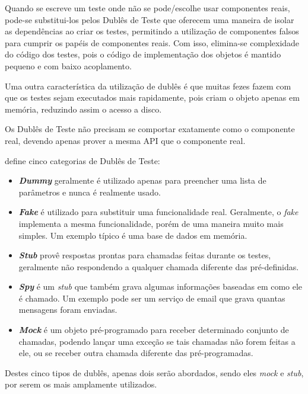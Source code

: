 Quando se escreve um teste onde não se pode/escolhe usar componentes reais, pode-se substitui-los pelos Dublês de Teste que oferecem uma maneira de isolar as dependências ao criar os testes, permitindo a utilização de componentes falsos para cumprir os papéis de componentes reais. Com isso, elimina-se complexidade do código dos testes, pois o código de implementação dos objetos é mantido pequeno e com baixo acoplamento.

Uma outra característica da utilização de dublês é que muitas fezes fazem com que os testes sejam executados mais rapidamente, pois criam o objeto apenas em memória, reduzindo assim o acesso a disco.

Os Dublês de Teste não precisam se comportar exatamente como o componente real, devendo apenas prover a mesma API que o componente real.

 define cinco categorias de Dublês de Teste:

\begin{itemize}
\item
\textbf{\textit{Dummy}} geralmente é utilizado apenas para preencher uma lista de parâmetros e nunca é realmente usado.

\item
\textbf{\textit{Fake}} é utilizado para substituir uma funcionalidade real. Geralmente, o \textit{fake} implementa a mesma funcionalidade, porém de uma maneira muito mais simples. Um exemplo típico é uma base de dados em memória.

\item
\textbf{\textit{Stub}} provê respostas prontas para chamadas feitas durante os testes, geralmente não respondendo a qualquer chamada diferente
das pré-definidas.

\item
\textbf{\textit{Spy}} é um \textit{stub} que também grava algumas informações baseadas em como ele é chamado. Um exemplo pode ser um serviço de email que grava quantas mensagens foram enviadas.

\item
\textbf{\textit{Mock}} é um objeto pré-programado para receber determinado conjunto de chamadas, podendo lançar uma exceção se tais chamadas não forem feitas a ele, ou se receber outra chamada diferente das pré-programadas.

\end{itemize}

Destes cinco tipos de dublês, apenas dois serão abordados, sendo eles \textit{mock} e \textit{stub}, por serem os mais amplamente utilizados.